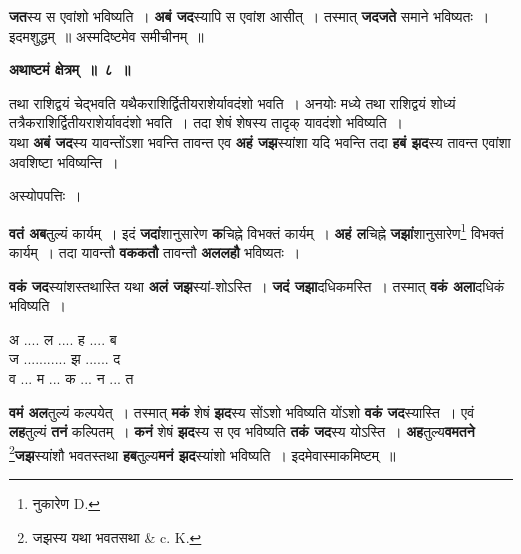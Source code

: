 \documentclass[11pt, openany]{book}
\begin{document}
\noindent \textbf{जत}स्य स एवांशो भविष्यति~। \textbf{अबं जद}स्यापि स एवांश आसीत्~। तस्मात् \textbf{जदजते} समाने भविष्यतः~। इदमशुद्धम्~॥ अस्मदिष्टमेव समीचीनम्~॥
\vspace{2mm}

 \begin{center}
\textbf{\large अथाष्टमं क्षेत्रम्~॥~८~॥}
\end{center}

 {\ab तथा राशिद्वयं चेद्भवति यथैकराशिर्द्वितीयराशेर्यावदंशो भवति~। अनयोः मध्ये तथा राशिद्वयं शोध्यं तत्रैकराशिर्द्वितीयराशेर्यावदंशो भवति~। तदा शेषं शेषस्य तादृक् यावदंशो भविष्यति~। }\\

 यथा \textbf{अबं जद}स्य यावन्तोंऽशा भवन्ति तावन्त एव \textbf{अहं जझ}स्यांशा यदि भवन्ति तदा \textbf{हबं झद}स्य तावन्त एवांशा अवशिष्टा भविष्यन्ति~। 
 
\begin{center}
अस्योपपत्तिः~।
\end{center}

 \textbf{वतं अब}तुल्यं कार्यम्~। इदं \textbf{जदां}शानुसारेण \textbf{क}चिह्ने विभक्तं कार्यम्~। \textbf{अहं ल}चिह्ने \textbf{जझां}शानुसारेण\renewcommand{\thefootnote}{१}\footnote{नुकारेण {\en D}.} विभक्तं कार्यम्~। तदा यावन्तौ \textbf{वककतौ} तावन्तौ \textbf{अललहौ} भविष्यतः~।
\vspace{-8mm}

\begin{flushleft}
\begin{minipage}[t]{0.58\textwidth}
 \textbf{वकं जद}स्यांशस्तथास्ति यथा \textbf{अलं जझ}स्यां-शोऽस्ति~। \textbf{जदं जझा}दधिकमस्ति~। तस्मात् \textbf{वकं अला}दधिकं भविष्यति~।
\end{minipage} 
\hfill
\begin{minipage}[t]{0.32\textwidth}
अ .... ल .... ह .... ब\\
ज ........... झ ...... द\\
व ... म ... क ... न ... त
\end{minipage}
\end{flushleft}

\newpage
\noindent \textbf{वमं अल}तुल्यं कल्पयेत्~। तस्मात् \textbf{मकं} शेषं \textbf{झद}स्य सोंऽशो भविष्यति योंऽशो \textbf{वकं जद}स्यास्ति~। एवं \textbf{लह}तुल्यं \textbf{तनं} कल्पितम्~। \textbf{कनं} शेषं \textbf{झद}स्य स एव भविष्यति \textbf{तकं जद}स्य योऽस्ति~। \textbf{अह}तुल्य\textbf{वमतने} \renewcommand{\thefootnote}{१}\footnote{जझस्य यथा भवतसथा {\en \& c. K.}}\textbf{जझ}स्यांशौ भवतस्तथा \textbf{हब}तुल्य\textbf{मनं झद}स्यांशो भविष्यति~। इदमेवास्माकमिष्टम्~॥ 
\vspace{2mm}
\end{document}
